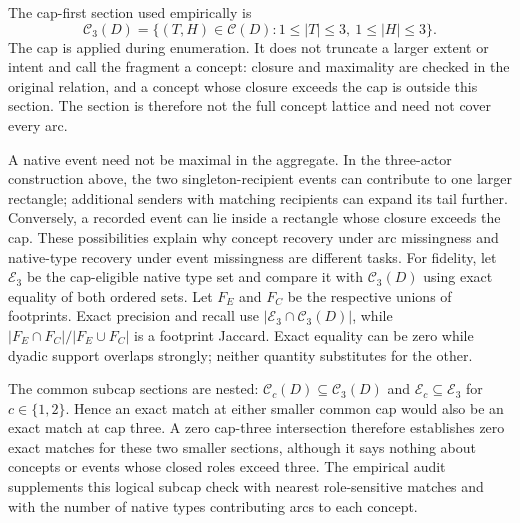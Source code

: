 \documentclass[10pt]{article}
\begin{document}
The cap-first section used empirically is
\begin{equation}
\mathcal C_3(D)=\{(T,H)\in\mathcal C(D):1\le |T|\le3,\ 1\le |H|\le3\}.
\label{eq:cap}
\end{equation}
The cap is applied during enumeration.  It does not truncate a larger extent or intent and call the fragment a concept: closure and maximality are checked in the original relation, and a concept whose closure exceeds the cap is outside this section.  The section is therefore not the full concept lattice and need not cover every arc.

A native event need not be maximal in the aggregate.  In the three-actor construction above, the two singleton-recipient events can contribute to one larger rectangle; additional senders with matching recipients can expand its tail further.  Conversely, a recorded event can lie inside a rectangle whose closure exceeds the cap.  These possibilities explain why concept recovery under arc missingness and native-type recovery under event missingness are different tasks.  For fidelity, let $\mathcal E_3$ be the cap-eligible native type set and compare it with $\mathcal C_3(D)$ using exact equality of both ordered sets.  Let $F_E$ and $F_C$ be the respective unions of footprints.  Exact precision and recall use $|\mathcal E_3\cap\mathcal C_3(D)|$, while $|F_E\cap F_C|/|F_E\cup F_C|$ is a footprint Jaccard.  Exact equality can be zero while dyadic support overlaps strongly; neither quantity substitutes for the other.

The common subcap sections are nested: $\mathcal C_c(D)\subseteq\mathcal C_3(D)$ and $\mathcal E_c\subseteq\mathcal E_3$ for $c\in\{1,2\}$. Hence an exact match at either smaller common cap would also be an exact match at cap three. A zero cap-three intersection therefore establishes zero exact matches for these two smaller sections, although it says nothing about concepts or events whose closed roles exceed three. The empirical audit supplements this logical subcap check with nearest role-sensitive matches and with the number of native types contributing arcs to each concept.
\end{document}
